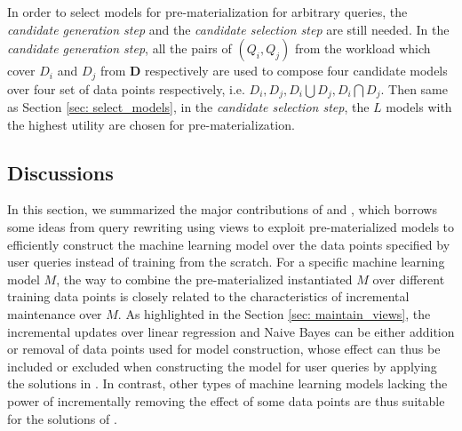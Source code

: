 In order to select models for pre-materialization for arbitrary queries, the {\em candidate generation step} and the {\em candidate selection step} are still needed. In the {\em candidate generation step}, all the pairs of $(Q_i, Q_j)$ from the workload which cover $D_i$ and $D_j$ from $\textbf{D}$ respectively are used to compose four candidate models over four set of data points respectively, i.e. $D_i, D_j, D_i \bigcup D_j, D_i \bigcap D_j$. Then same as Section \ref{sec: select_models}, in the {\em candidate selection step}, the $L$ models with the highest utility are chosen for pre-materialization.

\subsection{Discussions}
In this section, we summarized the major contributions of \cite{gupta2015processing} and \cite{hasani2018efficient}, which borrows some ideas from query rewriting using views to exploit pre-materialized models to efficiently construct the machine learning model over the data points specified by user queries instead of training from the scratch. For a specific machine learning model $M$, the way to combine the pre-materialized instantiated $M$ over different training data points is closely related to the characteristics of incremental maintenance over $M$. As highlighted in the Section \ref{sec: maintain_views}, the incremental updates over linear regression and Naive Bayes can be either addition or removal of data points used for model construction, whose effect can thus be included or excluded when constructing the model for user queries by applying the solutions in \cite{gupta2015processing}. In contrast, other types of machine learning models lacking the power of incrementally removing the effect of some data points are thus suitable for the solutions of \cite{hasani2018efficient}.

